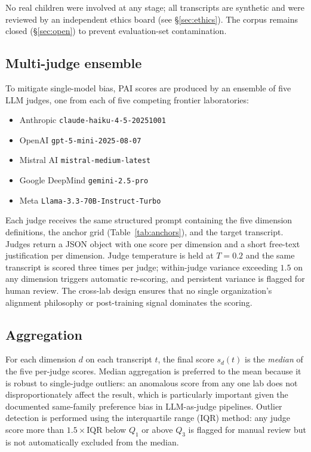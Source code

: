 \documentclass[11pt]{article}
\begin{document}
No real children were involved at any stage; all transcripts are synthetic and were reviewed by an independent ethics board (see \S\ref{sec:ethics}). The corpus remains closed (\S\ref{sec:open}) to prevent evaluation-set contamination.

\subsection{Multi-judge ensemble}
\label{sec:judges}

To mitigate single-model bias, PAI scores are produced by an ensemble of five LLM judges, one from each of five competing frontier laboratories:

\begin{itemize}[leftmargin=*,itemsep=1pt]
  \item Anthropic \texttt{claude-haiku-4-5-20251001}
  \item OpenAI \texttt{gpt-5-mini-2025-08-07}
  \item Mistral AI \texttt{mistral-medium-latest}
  \item Google DeepMind \texttt{gemini-2.5-pro}
  \item Meta \texttt{Llama-3.3-70B-Instruct-Turbo}
\end{itemize}

Each judge receives the same structured prompt containing the five dimension definitions, the anchor grid (Table~\ref{tab:anchors}), and the target transcript. Judges return a JSON object with one score per dimension and a short free-text justification per dimension. Judge temperature is held at $T = 0.2$ and the same transcript is scored three times per judge; within-judge variance exceeding $1.5$ on any dimension triggers automatic re-scoring, and persistent variance is flagged for human review. The cross-lab design ensures that no single organization's alignment philosophy or post-training signal dominates the scoring.

\subsection{Aggregation}
\label{sec:aggregation}

For each dimension $d$ on each transcript $t$, the final score $s_d(t)$ is the \emph{median} of the five per-judge scores. Median aggregation is preferred to the mean because it is robust to single-judge outliers: an anomalous score from any one lab does not disproportionately affect the result, which is particularly important given the documented same-family preference bias \citep{zheng2023judging} in LLM-as-judge pipelines. Outlier detection is performed using the interquartile range (IQR) method: any judge score more than $1.5 \times \mathrm{IQR}$ below $Q_1$ or above $Q_3$ is flagged for manual review but is not automatically excluded from the median.
\end{document}
